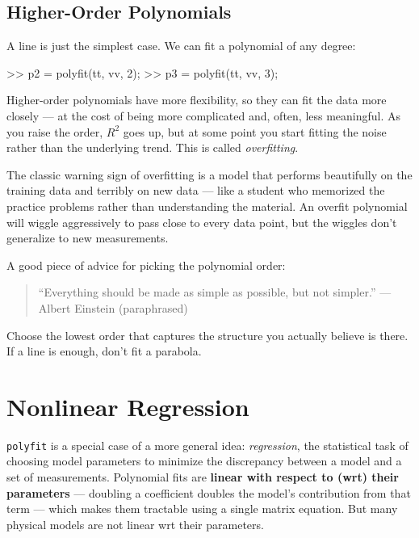 \documentclass[../../book.tex]{subfiles}
\begin{document}
\subsection{Higher-Order Polynomials}

A line is just the simplest case.  We can fit a polynomial of any degree:

\begin{code}
>> p2 = polyfit(tt, vv, 2);   %
>> p3 = polyfit(tt, vv, 3);   %
\end{code}

\noindent Higher-order polynomials have more flexibility, so they can fit the data more closely --- at the cost of being more complicated and, often, less meaningful.  As you raise the order, $R^2$ goes up, but at some point you start fitting the noise rather than the underlying trend.  This is called \emph{overfitting}.


The classic warning sign of overfitting is a model that performs beautifully on the training data and terribly on new data --- like a student who memorized the practice problems rather than understanding the material.  An overfit polynomial will wiggle aggressively to pass close to every data point, but the wiggles don't generalize to new measurements.

A good piece of advice for picking the polynomial order:

\begin{quote}
``Everything should be made as simple as possible, but not simpler.''
\hspace{1em}---\,Albert Einstein (paraphrased)
\end{quote}

\noindent Choose the lowest order that captures the structure you actually believe is there.  If a line is enough, don't fit a parabola.

\section{Nonlinear Regression}


\lstinline{polyfit} is a special case of a more general idea: \emph{regression}, the statistical task of choosing model parameters to minimize the discrepancy between a model and a set of measurements.  Polynomial fits are \textbf{linear with respect to (wrt) their parameters} --- doubling a coefficient doubles the model's contribution from that term --- which makes them tractable using a single matrix equation.  But many physical models are not linear wrt their parameters.
\end{document}
